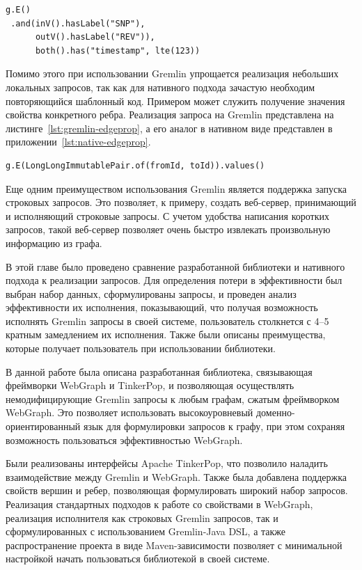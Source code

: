 \documentclass[times,specification,annotation]{itmo-student-thesis}
\begin{document}
\begin{lstlisting}[float=!h,caption={Получение ребер по типам вершин на Gremlin},label={lst:gremlin-edges}]
g.E()
 .and(inV().hasLabel("SNP"),
      outV().hasLabel("REV")),
      both().has("timestamp", lte(123))
\end{lstlisting}

Помимо этого при использовании Gremlin упрощается реализация небольших локальных запросов, так как для нативного подхода зачастую необходим повторяющийся шаблонный код. Примером может служить получение значения свойства конкретного ребра. Реализация запроса на Gremlin представлена на листинге~\ref{lst:gremlin-edgeprop}, а его аналог в нативном виде представлен в приложении~\ref{lst:native-edgeprop}.

\begin{lstlisting}[float=!h,caption={Получение свойства ребра на Gremlin},label={lst:gremlin-edgeprop}]
g.E(LongLongImmutablePair.of(fromId, toId)).values()
\end{lstlisting}

Еще одним преимуществом использования Gremlin является поддержка запуска строковых запросов. Это позволяет, к примеру, создать веб-сервер, принимающий и исполняющий строковые запросы. С учетом удобства написания коротких запросов, такой веб-сервер позволяет очень быстро извлекать произвольную информацию из графа.

\chapterconclusion

В этой главе было проведено сравнение разработанной библиотеки и нативного подхода к реализации запросов. Для определения потери в эффективности был выбран набор данных, сформулированы запросы, и проведен анализ эффективности их исполнения, показывающий, что получая возможность исполнять Gremlin запросы в своей системе, пользователь столкнется с 4--5 кратным замедлением их исполнения. Также были описаны преимущества, которые получает пользователь при использовании библиотеки.

\startconclusionpage

В данной работе была описана разработанная библиотека, связывающая фреймворки WebGraph и TinkerPop, и позволяющая осуществлять немодифицирующие Gremlin запросы к любым графам, сжатым фреймворком WebGraph. Это позволяет использовать высокоуровневый доменно-ориентированный язык для формулировки запросов к графу, при этом сохраняя возможность пользоваться эффективностью WebGraph.

Были реализованы интерфейсы Apache TinkerPop, что позволило наладить взаимодействие между Gremlin и WebGraph. Также была добавлена поддержка свойств вершин и ребер, позволяющая формулировать широкий набор запросов. Реализация стандартных подходов к работе со свойствами в WebGraph, реализация исполнителя как строковых Gremlin запросов, так и сформулированных с использованием Gremlin-Java DSL, а также распространение проекта в виде Maven-зависимости позволяет с минимальной настройкой начать пользоваться библиотекой в своей системе.
\end{document}

